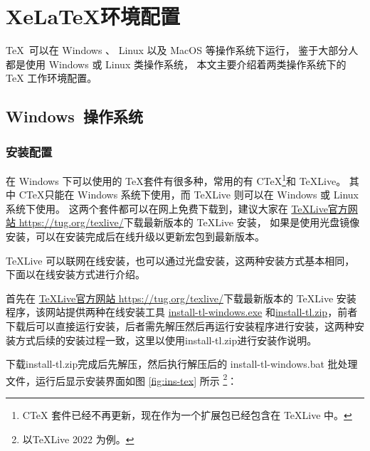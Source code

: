 
%
%
%

\chapter{XeLaTeX环境配置}
\label{chap02}

\TeX{}~可以在 Windows 、 Linux 以及 MacOS 等操作系统下运行，
鉴于大部分人都是使用 Windows 或 Linux 类操作系统，
本文主要介绍着两类操作系统下的 \TeX{} 工作环境配置。

\section{Windows~操作系统}

\subsection{安装配置}
在 Windows 下可以使用的 \TeX{}套件有很多种，常用的有 C\TeX{}\footnote{C\TeX{} 套件已经不再更新，现在作为一个扩展包已经包含在 \TeX{}Live 中。}和 \TeX{}Live。
其中 C\TeX{}只能在 Windows 系统下使用，而 \TeX{}Live 则可以在 Windows 或 Linux 系统下使用。
这两个套件都可以在网上免费下载到，建议大家在 \href{https://tug.org/texlive/}{\TeX{}Live官方网站 https://tug.org/texlive/}下载最新版本的 \TeX{}Live 安装，
如果是使用光盘镜像安装，可以在安装完成后在线升级以更新宏包到最新版本。

\TeX{}Live 可以联网在线安装，也可以通过光盘安装，这两种安装方式基本相同，下面以在线安装方式进行介绍。

首先在 \href{https://tug.org/texlive/}{\TeX{}Live官方网站 https://tug.org/texlive/}下载最新版本的 \TeX{}Live 安装程序，该网站提供两种在线安装工具 \href{https://mirror.ctan.org/systems/texlive/tlnet/install-tl-windows.exe}{install-tl-windows.exe} 和\href{https://mirror.ctan.org/systems/texlive/tlnet/install-tl.zip}{install-tl.zip}，前者下载后可以直接运行安装，后者需先解压然后再运行安装程序进行安装，这两种安装方式后续的安装过程一致，这里以使用install-tl.zip进行安装作说明。

下载install-tl.zip完成后先解压，然后执行解压后的 install-tl-windows.bat 批处理文件，运行后显示安装界面如图 \ref{fig:ins-tex} 所示 \footnote{以TeXLive 2022 为例。}：

